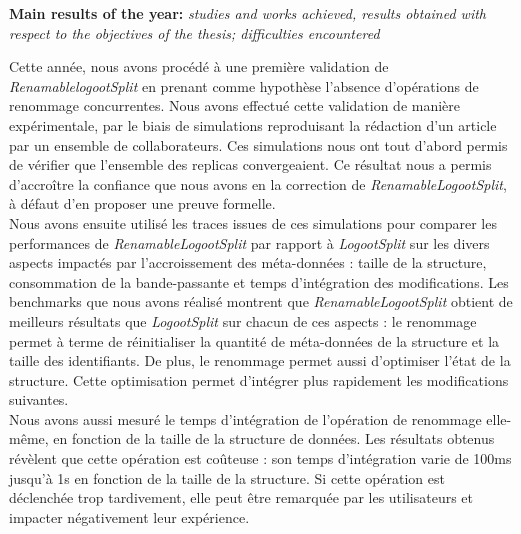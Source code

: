 \documentclass[12pt]{article}
\newcommand{\commentaire}[1]{\small\textit{#1}}
\begin{document}
\noindent\textbf{Main results of the year:}
\commentaire{%
  studies and works achieved, results obtained with respect to the
  objectives of the thesis; difficulties encountered\\}


Cette année, nous avons procédé à une première validation de \emph{RenamablelogootSplit} en prenant comme hypothèse l'absence d'opérations de renommage concurrentes.
Nous avons effectué cette validation de manière expérimentale, par le biais de simulations reproduisant la rédaction d'un article par un ensemble de collaborateurs.
Ces simulations nous ont tout d'abord permis de vérifier que l'ensemble des replicas convergeaient.
Ce résultat nous a permis d'accroître la confiance que nous avons en la correction de \emph{RenamableLogootSplit}, à défaut d'en proposer une preuve formelle.
\\

Nous avons ensuite utilisé les traces issues de ces simulations pour comparer les performances de \emph{RenamableLogootSplit} par rapport à \emph{LogootSplit} sur les divers aspects impactés par l'accroissement des méta-données : taille de la structure, consommation de la bande-passante et temps d'intégration des modifications.
Les benchmarks que nous avons réalisé montrent que \emph{RenamableLogootSplit} obtient de meilleurs résultats que \emph{LogootSplit} sur chacun de ces aspects :
le renommage permet à terme de réinitialiser la quantité de méta-données de la structure et la taille des identifiants.
De plus, le renommage permet aussi d'optimiser l'état de la structure.
Cette optimisation permet d'intégrer plus rapidement les modifications suivantes.
\\

Nous avons aussi mesuré le temps d'intégration de l'opération de renommage elle-même, en fonction de la taille de la structure de données.
Les résultats obtenus révèlent que cette opération est coûteuse : son temps d'intégration varie de 100ms jusqu'à 1s en fonction de la taille de la structure.
Si cette opération est déclenchée trop tardivement, elle peut être remarquée par les utilisateurs et impacter négativement leur expérience.
\\
\end{document}
